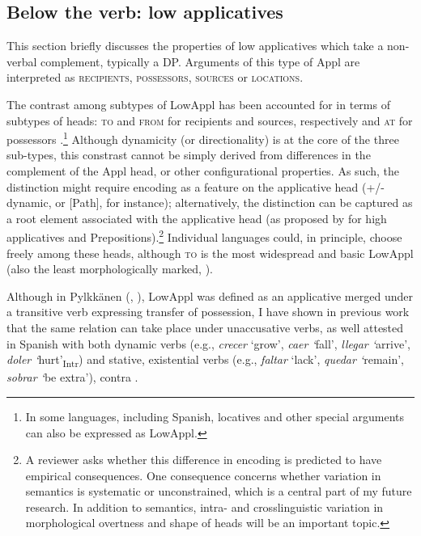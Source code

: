 \documentclass[output=paper,colorlinks,citecolor=brown,nonflat]{./langscibook}
\begin{document}
\subsection{Below the verb: low applicatives}\label{sec:cuervo:4.1}

This section briefly discusses the properties of low applicatives which take a non-verbal complement, typically a DP. Arguments of this type of Appl are interpreted as \textsc{recipients}, \textsc{possessors}, \textsc{sources} or \textsc{locations}. 

The contrast among subtypes of LowAppl has been accounted for in terms of subtypes of heads: \textsc{to} and \textsc{from} for recipients and sources, respectively \citep{Pylkkänen2008} and \textsc{at} for possessors \citep{Cuervo2003}.\footnote{In some languages, including Spanish, locatives and other special arguments can also be expressed as LowAppl.} Although dynamicity (or directionality) is at the core of the three sub-types, this constrast cannot be simply derived from differences in the complement of the Appl head, or other configurational properties.  As such, the distinction might require encoding as a feature on the applicative head (+/- dynamic, or [Path], for instance); alternatively, the distinction can be captured as a root element associated with the applicative head (as proposed by \citealt{WoodMarantz2017} for high applicatives and Prepositions).\footnote{A reviewer asks whether this difference in encoding is predicted to have empirical consequences. One consequence concerns whether variation in semantics is systematic or unconstrained, which is a central part of my future research. In addition to semantics, intra- and crosslinguistic variation in morphological overtness and shape of heads will be an important topic.} Individual languages could, in principle, choose freely among these heads, although \textsc{to} is the most widespread and basic LowAppl (also the least morphologically marked, \citealt{Cuervo2015Chapter}).

Although in Pylkkänen (\citeyear{Pylkkänen2002}, \citeyear{Pylkkänen2008}), LowAppl was defined as an applicative merged under a transitive verb expressing transfer of possession, I have shown in previous work that the same relation can take place under unaccusative verbs, as well attested in Spanish with both dynamic verbs (e.g., \textit{crecer} ‘grow’, \textit{caer ‘}fall’, \textit{llegar ‘}arrive’, \textit{doler ‘}hurt’\textsubscript{Intr}) and stative, existential verbs (e.g., \textit{faltar} ‘lack’, \textit{quedar ‘}remain’, \textit{sobrar ‘}be extra’), contra \citet{Baker1996}. 
\end{document}
